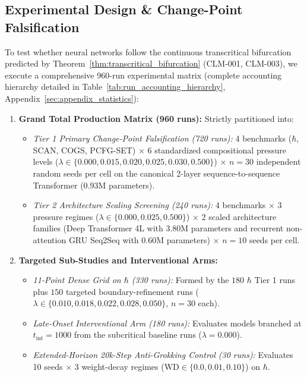 \documentclass{article}
\theoremstyle{plain}
\theoremstyle{definition}
\begin{document}
\subsection{Experimental Design \& Change-Point Falsification}
To test whether neural networks follow the continuous transcritical bifurcation predicted by Theorem~\ref{thm:transcritical_bifurcation} (CLM-001, CLM-003), we execute a comprehensive 960-run experimental matrix (complete accounting hierarchy detailed in Table~\ref{tab:run_accounting_hierarchy}, Appendix~\ref{sec:appendix_statistics}):
\begin{enumerate}[leftmargin=*,noitemsep]
    \item \textbf{Grand Total Production Matrix (960 runs):} Strictly partitioned into:
    \begin{itemize}[noitemsep]
        \item \emph{Tier 1 Primary Change-Point Falsification (720 runs):} 4 benchmarks ($\hbar$, SCAN, COGS, PCFG-SET) $\times$ 6 standardized compositional pressure levels ($\lambda \in \{0.000, 0.015, 0.020, 0.025, 0.030, 0.500\}$) $\times$ $n = 30$ independent random seeds per cell on the canonical 2-layer sequence-to-sequence Transformer ($0.93\text{M}$ parameters).
        \item \emph{Tier 2 Architecture Scaling Screening (240 runs):} 4 benchmarks $\times$ 3 pressure regimes ($\lambda \in \{0.000, 0.025, 0.500\}$) $\times$ 2 scaled architecture families (Deep Transformer 4L with 3.80M parameters and recurrent non-attention GRU Seq2Seq with 0.60M parameters) $\times$ $n = 10$ seeds per cell.
    \end{itemize}
    \item \textbf{Targeted Sub-Studies and Interventional Arms:}
    \begin{itemize}[noitemsep]
        \item \emph{11-Point Dense Grid on $\hbar$ (330 runs):} Formed by the $180$ $\hbar$ Tier 1 runs plus $150$ targeted boundary-refinement runs ($\lambda \in \{0.010, 0.018, 0.022, 0.028, 0.050\}$, $n=30$ each).
        \item \emph{Late-Onset Interventional Arm (180 runs):} Evaluates models branched at $t_{\text{int}}=1000$ from the subcritical baseline runs ($\lambda = 0.000$).
        \item \emph{Extended-Horizon 20k-Step Anti-Grokking Control (30 runs):} Evaluates 10 seeds $\times$ 3 weight-decay regimes ($\text{WD} \in \{0.0, 0.01, 0.10\}$) on $\hbar$.
    \end{itemize}
\end{enumerate}
\end{document}

